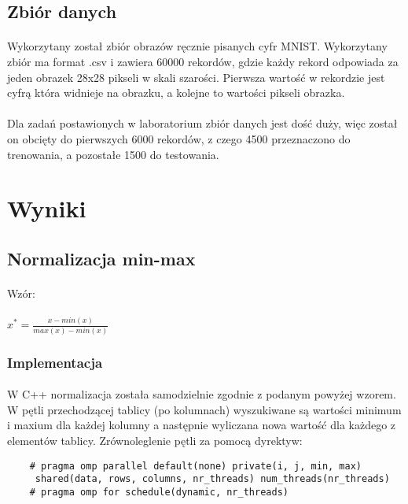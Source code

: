 \documentclass[a4paper,11pt]{article}
\begin{document}
\subsection{Zbiór danych} 
\paragraph{}Wykorzytany został zbiór obrazów ręcznie pisanych cyfr MNIST. Wykorzytany zbiór ma format .csv i zawiera 60000 rekordów, gdzie każdy rekord odpowiada za jeden obrazek 28x28 pikseli w skali szarości. Pierwsza wartość w rekordzie jest cyfrą która widnieje na obrazku, a kolejne to wartości pikseli obrazka. 
\paragraph{}
Dla zadań postawionych w laboratorium zbiór danych jest dość duży, więc został on obcięty do pierwszych 6000 rekordów, z czego 4500 przeznaczono do trenowania, a pozostałe 1500 do testowania.
\newpage    
\section{Wyniki}   
\subsection{Normalizacja min-max} 
\paragraph{}Wzór:
\paragraph{}$x^*=\frac{x-min(x)}{max(x)-min(x)}$
\subsubsection{Implementacja} 
\paragraph{}W C++ normalizacja została samodzielnie zgodnie z podanym powyżej wzorem. W pętli przechodzącej tablicy (po kolumnach) wyszukiwane są wartości minimum i maxium dla każdej kolumny a następnie wyliczana nowa wartość dla każdego z elementów tablicy. Zrównoleglenie pętli za pomocą dyrektyw:
\begin{lstlisting}
	# pragma omp parallel default(none) private(i, j, min, max)
	 shared(data, rows, columns, nr_threads) num_threads(nr_threads)
	# pragma omp for schedule(dynamic, nr_threads)\end{lstlisting}
\end{document}
